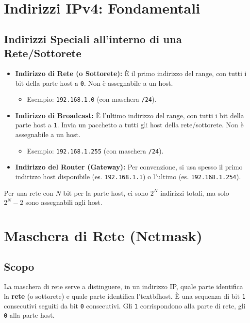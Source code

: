 \section{Indirizzi IPv4: Fondamentali}

\subsection{Indirizzi Speciali all'interno di una Rete/Sottorete}
\begin{itemize}
    \item \textbf{Indirizzo di Rete (o Sottorete):} È il primo indirizzo del range, con tutti i bit della parte host a \texttt{0}. Non è assegnabile a un host.
    \begin{itemize}
        \item Esempio: \texttt{192.168.1.0} (con maschera \texttt{/24}).
    \end{itemize}
    \item \textbf{Indirizzo di Broadcast:} È l'ultimo indirizzo del range, con tutti i bit della parte host a \texttt{1}. Invia un pacchetto a tutti gli host della rete/sottorete. Non è assegnabile a un host.
    \begin{itemize}
        \item Esempio: \texttt{192.168.1.255} (con maschera \texttt{/24}).
    \end{itemize}
    \item \textbf{Indirizzo del Router (Gateway):} Per convenzione, si usa spesso il primo indirizzo host disponibile (es. \texttt{192.168.1.1}) o l'ultimo (es. \texttt{192.168.1.254}).
\end{itemize}
Per una rete con $N$ bit per la parte host, ci sono $2^N$ indirizzi totali, ma solo $2^N - 2$ sono assegnabili agli host.

\section{Maschera di Rete (Netmask)}

\subsection{Scopo}
La maschera di rete serve a distinguere, in un indirizzo IP, quale parte identifica la \textbf{rete} (o sottorete) e quale parte identifica l'textbf{host}.
È una sequenza di bit \texttt{1} consecutivi seguiti da bit \texttt{0} consecutivi. Gli \texttt{1} corrispondono alla parte di rete, gli \texttt{0} alla parte host.

